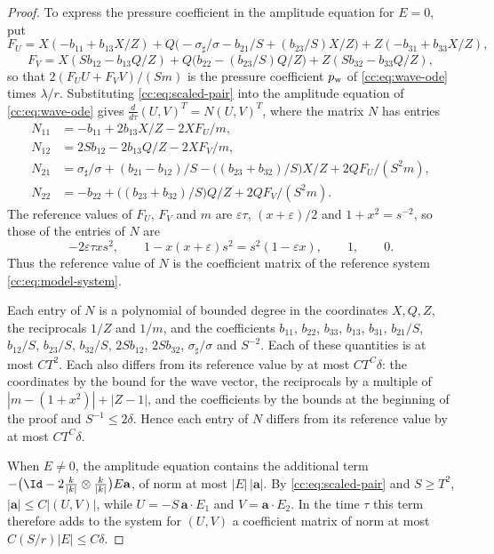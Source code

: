 \begin{proof}
To express the pressure coefficient in the amplitude equation for $E=0$, put
\[
 F_U=X(-b_{11}+b_{13}X/Z)
 +Q\bigl(-\sigma_\sharp/\sigma-b_{21}/S+(b_{23}/S)X/Z\bigr)
 +Z(-b_{31}+b_{33}X/Z),
\]
\[
 F_V=X(Sb_{12}-b_{13}Q/Z)
 +Q\bigl(b_{22}-(b_{23}/S)Q/Z\bigr)
 +Z(Sb_{32}-b_{33}Q/Z),
\]
so that $2(F_UU+F_VV)/(Sm)$ is the pressure coefficient $p_{\rm w}$ of
\eqref{cc:eq:wave-ode} times $\lambda/r$. Substituting
\eqref{cc:eq:scaled-pair} into the amplitude equation of
\eqref{cc:eq:wave-ode} gives
$\frac{d}{d\tau}(U,V)^T=N(U,V)^T$, where the matrix $N$ has entries
\begin{align*}
 N_{11}&=-b_{11}+2b_{13}X/Z-2XF_U/m,\\
 N_{12}&=2Sb_{12}-2b_{13}Q/Z-2XF_V/m,\\
 N_{21}&=\sigma_\sharp/\sigma+(b_{21}-b_{12})/S
 -\bigl((b_{23}+b_{32})/S\bigr)X/Z+2QF_U/(S^2m),\\
 N_{22}&=-b_{22}+\bigl((b_{23}+b_{32})/S\bigr)Q/Z+2QF_V/(S^2m).
\end{align*}
The reference values of $F_U$, $F_V$ and $m$ are $\varepsilon\tau$,
$(x+\varepsilon)/2$ and $1+x^2=s^{-2}$, so those of the entries of $N$
are
\[
 -2\varepsilon\tau xs^2,\qquad
 1-x(x+\varepsilon)s^2=s^2(1-\varepsilon x),\qquad 1,\qquad 0 .
\]
Thus the reference value of $N$ is the coefficient matrix of the
reference system \eqref{cc:eq:model-system}.

Each entry of $N$ is a polynomial of bounded degree in the coordinates
$X,Q,Z$, the reciprocals $1/Z$ and $1/m$, and the coefficients
$b_{11}$, $b_{22}$, $b_{33}$, $b_{13}$, $b_{31}$, $b_{21}/S$,
$b_{12}/S$, $b_{23}/S$, $b_{32}/S$, $2Sb_{12}$, $2Sb_{32}$,
$\sigma_\sharp/\sigma$ and $S^{-2}$. Each of these quantities is at
most $CT^2$. Each also differs from its reference value by at most
$CT^C\delta$: the coordinates by the bound for the wave vector, the
reciprocals by a multiple of $|m-(1+x^2)|+|Z-1|$, and the coefficients
by the bounds at the beginning of the proof and $S^{-1}\le2\delta$.
Hence each entry of $N$ differs from its reference value by at most
$CT^C\delta$.

When $E\ne0$, the amplitude equation contains the additional term
$-\bigl(\Id-2\frac{k}{|k|}\otimes\frac{k}{|k|}\bigr)E\mathbf a$, of
norm at most $|E|\,|\mathbf a|$. By \eqref{cc:eq:scaled-pair} and
$S\ge T^2$, $|\mathbf a|\le C|(U,V)|$, while
$U=-S\,\mathbf a\cdot E_1$ and $V=\mathbf a\cdot E_2$. In the time
$\tau$ this term therefore adds to the system for $(U,V)$ a coefficient
matrix of norm at most $C(S/r)|E|\le C\delta$.
\end{proof}

